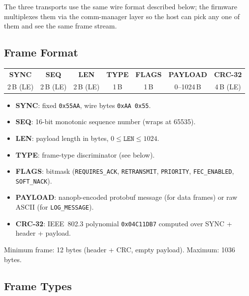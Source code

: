 The three transports use the same wire format described below; the
firmware multiplexes them via the comm-manager layer so the host can pick
any one of them and see the same frame stream.

\subsection{Frame Format}

\begin{center}
\begin{tabular}{|c|c|c|c|c|c|c|}
\hline
\textbf{SYNC} & \textbf{SEQ} & \textbf{LEN} & \textbf{TYPE} & \textbf{FLAGS} & \textbf{PAYLOAD} & \textbf{CRC-32} \\
2\,B (LE)     & 2\,B (LE)    & 2\,B (LE)    & 1\,B          & 1\,B           & 0--1024\,B       & 4\,B (LE) \\
\hline
\end{tabular}
\end{center}

\begin{itemize}
  \item \textbf{SYNC}: fixed \texttt{0x55AA}, wire bytes \texttt{0xAA 0x55}.
  \item \textbf{SEQ}: 16-bit monotonic sequence number (wraps at 65535).
  \item \textbf{LEN}: payload length in bytes, $0 \le \mathtt{LEN} \le 1024$.
  \item \textbf{TYPE}: frame-type discriminator (see below).
  \item \textbf{FLAGS}: bitmask (\texttt{REQUIRES\_ACK}, \texttt{RETRANSMIT},
        \texttt{PRIORITY}, \texttt{FEC\_ENABLED}, \texttt{SOFT\_NACK}).
  \item \textbf{PAYLOAD}: nanopb-encoded protobuf message (for data frames) or
        raw ASCII (for \texttt{LOG\_MESSAGE}).
  \item \textbf{CRC-32}: IEEE~802.3 polynomial \texttt{0x04C11DB7} computed
        over SYNC + header + payload.
\end{itemize}

Minimum frame: 12 bytes (header + CRC, empty payload). Maximum: 1036 bytes.

\subsection{Frame Types}

